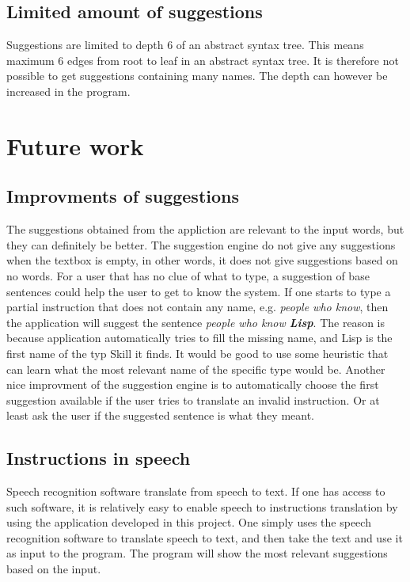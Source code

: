 \subsection*{Limited amount of suggestions}
Suggestions are limited to depth 6 of an abstract syntax tree. This means maximum 6 edges from root to leaf in an abstract syntax tree. It is therefore not possible to get suggestions containing many names. The depth can however be increased in the program.

\section{Future work}
\subsection*{Improvments of suggestions}
The suggestions obtained from the appliction are relevant to the input words, but they can definitely be better. The suggestion engine do not give any suggestions when the textbox is empty, in other words, it does not give suggestions based on no words. For a user that has no clue of what to type, a suggestion of base sentences could help the user to get to know the system.
\newline
\newline
If one starts to type a partial instruction that does not contain any name, e.g. \emph{people who know}, then the application will suggest the sentence \emph{people who know \textbf{Lisp}}. The reason is because application automatically tries to fill the missing name, and Lisp is the first name of the typ Skill it finds. It would be good to use some heuristic that can learn what the most relevant name of the specific type would be.
\newline
\newline
Another nice improvment of the suggestion engine is to automatically choose the first suggestion available if the user tries to translate an invalid instruction. Or at least ask the user if the suggested sentence is what they meant.

\subsection*{Instructions in speech}
Speech recognition software translate from speech to text. If one has access to such software, it is relatively easy to enable speech to instructions translation by using the application developed in this project. One simply uses the speech recognition software to translate speech to text, and then take the text and use it as input to the program. The program will show the most relevant suggestions based on the input.

